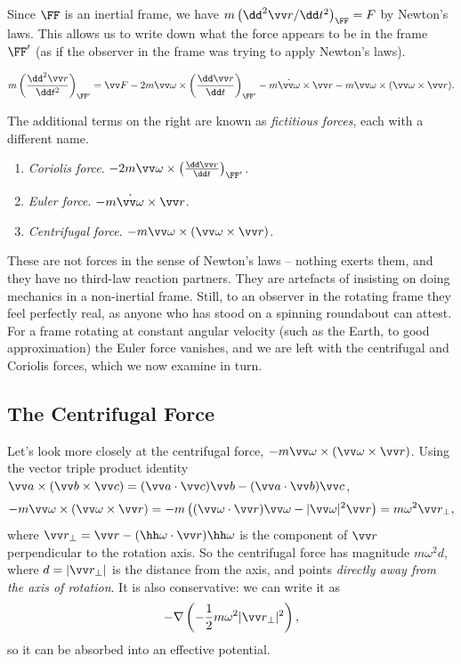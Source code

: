 Since $\FF$ is an inertial frame, we have $m\left(\dd^2 \vv r/ \dd t^2\right)_{\FF} = F$ by Newton's laws. This allows us to write down what the force appears to be in the frame $\FF'$ (as if the observer in the frame was trying to apply Newton's laws).

$$
m \left(\frac{\dd^2 \vv r}{\dd t^2}\right)_{\FF'} = \vv F - 2m \vv \omega \times \left(\frac{\dd \vv r}{\dd t}\right)_{\FF'} - m\dot{\vv \omega} \times \vv r - m\vv \omega \times (\vv \omega \times \vv r).
$$

The additional terms on the right are known as \emph{fictitious forces}, each with a different name.

\begin{enumerate}
	\item \emph{Coriolis force}. $- 2m \vv \omega \times \left(\frac{\dd \vv r}{\dd t}\right)_{\FF'}$.
	\item \emph{Euler force}. $- m\dot{\vv \omega} \times \vv r$.
	\item \emph{Centrifugal force}. $- m\vv \omega \times (\vv \omega \times \vv r)$.
\end{enumerate}

These are not forces in the sense of Newton's laws -- nothing exerts them, and they have no third-law reaction partners. They are artefacts of insisting on doing mechanics in a non-inertial frame. Still, to an observer in the rotating frame they feel perfectly real, as anyone who has stood on a spinning roundabout can attest. For a frame rotating at constant angular velocity (such as the Earth, to good approximation) the Euler force vanishes, and we are left with the centrifugal and Coriolis forces, which we now examine in turn.

\subsection{The Centrifugal Force}

Let's look more closely at the centrifugal force, $-m \vv \omega \times (\vv \omega \times \vv r)$. Using the vector triple product identity $\vv a \times (\vv b \times \vv c) = (\vv a \cdot \vv c)\vv b - (\vv a \cdot \vv b) \vv c$,
$$
-m \vv \omega \times (\vv \omega \times \vv r) = -m\left((\vv \omega \cdot \vv r)\vv \omega - |\vv\omega|^2 \vv r\right) = m \omega^2 \vv r_\perp,
$$
where $\vv r_\perp = \vv r - (\hh \omega \cdot \vv r)\hh \omega$ is the component of $\vv r$ perpendicular to the rotation axis. So the centrifugal force has magnitude $m\omega^2 d$, where $d = |\vv r_\perp|$ is the distance from the axis, and points \emph{directly away from the axis of rotation}. It is also conservative: we can write it as
$$
-\nabla \left(-\frac{1}{2}m\omega^2 |\vv r_\perp|^2\right),
$$
so it can be absorbed into an effective potential.


